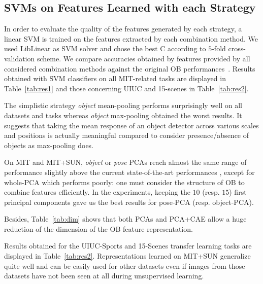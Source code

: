 \documentclass[runningheads,a4paper]{llncs}
\begin{document}
\subsection{SVMs on Features Learned with each Strategy} 

In order to evaluate the quality of the features generated by each
strategy, a linear SVM is trained on the features extracted 
by each combination method.
%
We used LibLinear \citep{liblinear} as SVM solver and chose the best C
according to $5$-fold cross-validation scheme.
%
We compare accuracies obtained by features provided by all considered
combination methods against the original OB performances~\citep{LiJiaLi10}. 
%
Results obtained with SVM classifiers on all MIT-related tasks are
displayed in Table~\ref{tab:res1} and those concerning UIUC and
15-scenes in Table~\ref{tab:res2}.

%
The simplistic strategy \textit{object} mean-pooling performs surprisingly well
on all datasets and tasks whereas \textit{object} max-pooling obtained the
worst results.  It suggests that taking the mean response of an object detector
across various scales and positions is actually meaningful compared to consider
presence/absence of objects as max-pooling does.
%
%

On MIT and MIT+SUN, \textit{object} or \textit{pose} PCAs reach almost the same
range of performance slightly above the current state-of-the-art performances
\citep{Pandey11}, except for whole-PCA which performs poorly: one must consider
the structure of OB to combine features efficiently. In the experiments,
keeping the $10$ (resp. $15$) first principal components gave us the best
results for pose-PCA (resp. object-PCA).

%
Besides, Table~\ref{tab:dim} shows that both PCAs and PCA+CAE allow a huge
reduction of the dimension of the OB feature representation.
%

Results obtained for the UIUC-Sports and 15-Scenes transfer learning tasks are
displayed in Table~\ref{tab:res2}. Representations learned on MIT+SUN
generalize quite well and can be easily used for other datasets even if images
from those datasets  have not been seen at all during unsupervised learning.
\end{document}
